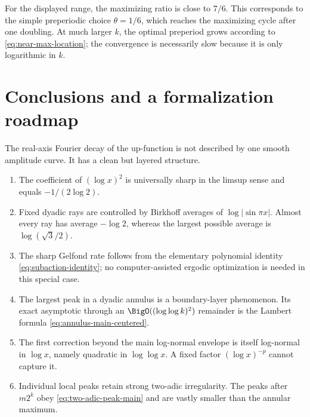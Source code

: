 \documentclass[11pt,oneside]{article}
\theoremstyle{definition}
\theoremstyle{remark}
\begin{document}
For the displayed range, the maximizing ratio is close to \(7/6\).  This
corresponds to the simple preperiodic choice \(\theta=1/6\), which reaches the
maximizing cycle after one doubling.  At much larger \(k\), the optimal
preperiod grows according to \eqref{eq:near-max-location}; the convergence is
necessarily slow because it is only logarithmic in \(k\).

\section{Conclusions and a formalization roadmap}
\label{sec:conclusion}

The real-axis Fourier decay of the up-function is not described by one smooth
amplitude curve.  It has a clean but layered structure.

\begin{enumerate}
 \item The coefficient of \((\log x)^2\) is universally sharp in the limsup
 sense and equals \(-1/(2\log2)\).
 \item Fixed dyadic rays are controlled by Birkhoff averages of
 \(\log|\sin\pi x|\).  Almost every ray has average \(-\log2\), whereas the
 largest possible average is \(\log(\sqrt3/2)\).
 \item The sharp Gelfond rate follows from the elementary polynomial identity
 \eqref{eq:subaction-identity}; no computer-assisted ergodic optimization is
 needed in this special case.
 \item The largest peak in a dyadic annulus is a boundary-layer phenomenon.
 Its exact asymptotic through an \(\BigO((\log\log k)^2)\) remainder is the
 Lambert formula \eqref{eq:annulus-main-centered}.
 \item The first correction beyond the main log-normal envelope is itself
 log-normal in \(\log x\), namely quadratic in \(\log\log x\).  A fixed
 factor \((\log x)^{-p}\) cannot capture it.
 \item Individual local peaks retain strong two-adic irregularity.  The peaks
 after \(m2^k\) obey \eqref{eq:two-adic-peak-main} and are vastly smaller than
 the annular maximum.
\end{enumerate}
\end{document}
